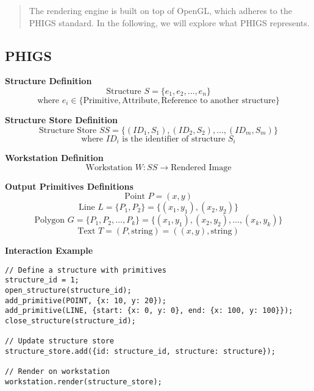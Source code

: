 





\begin{quote}
The rendering engine is built on top of OpenGL, which adheres to the PHIGS standard. In the following, we will explore what PHIGS represents.
\end{quote}

\subsection*{PHIGS}

\textbf{Structure Definition}
\[
\text{Structure } S = \{e_1, e_2, \ldots, e_n \}
\]
\[
\text{where } e_i \in \{\text{Primitive}, \text{Attribute}, \text{Reference to another structure} \}
\]

\textbf{Structure Store Definition}
\[
\text{Structure Store } SS = \{(ID_1, S_1), (ID_2, S_2), \ldots, (ID_m, S_m)\}
\]
\[
\text{where } ID_i \text{ is the identifier of structure } S_i
\]

\textbf{Workstation Definition}
\[
\text{Workstation } W : SS \rightarrow \text{Rendered Image}
\]

\textbf{Output Primitives Definitions}
\[
\text{Point } P = (x, y)
\]
\[
\text{Line } L = \{P_1, P_2\} = \{(x_1, y_1), (x_2, y_2)\}
\]
\[
\text{Polygon } G = \{P_1, P_2, \ldots, P_k\} = \{(x_1, y_1), (x_2, y_2), \ldots, (x_k, y_k)\}
\]
\[
\text{Text } T = (P, \text{string}) = ((x, y), \text{string})
\]

\textbf{Interaction Example}
\begin{lstlisting}
// Define a structure with primitives
structure_id = 1;
open_structure(structure_id);
add_primitive(POINT, {x: 10, y: 20});
add_primitive(LINE, {start: {x: 0, y: 0}, end: {x: 100, y: 100}});
close_structure(structure_id);

// Update structure store
structure_store.add({id: structure_id, structure: structure});

// Render on workstation
workstation.render(structure_store);
\end{lstlisting}










